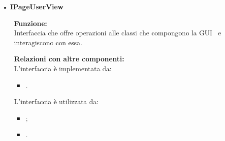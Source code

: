 {\begin{sloppypar}
{\begin{itemize}
\begin{itemize}
				\item[]  \textbf{Relazioni con altre componenti:} \\
				Implementa l’interfaccia:
				\begin{itemize}
					\item {}.
				\end{itemize}
				Usa le classi:
				\begin{itemize}
					\item {}.
				\end{itemize}					
				Tramite le interfacce:
				\begin{itemize}
					\item {}.
				\end{itemize}
				
				\item[]  \textbf{Attributi:}\\
				\texttt{- ICommunicationLogic communicationLogic}: riferimento alla classe \texttt{CommunicationLogic}.\\
				
				\item[]  \textbf{Metodi:}\\
				\texttt{+ MediaManage(IComunicationLogic comunicationLogic);}\\
				Costruttore: inizializza \texttt{CommunicationLogic} con il valore ricevuto come parametro.\\

				\texttt{+ void activeVideoLocal();}\\
				Invia una richiesta al Presenter attraverso il metodo \texttt{getLocalUrl()} per recuperare l’indirizzo del 
				video locale.\\
			\end{itemize}

		\item[•] \textbf{IPageUserView}
		\begin{itemize}
			\item[] \textbf{Funzione:} \\
			Interfaccia che offre operazioni alle classi che compongono la GUI\g~ e interagiscono con essa.
			
			\item[] \textbf{Relazioni con altre componenti:} \\
			L'interfaccia è implementata da:
			\begin{itemize}
				\item {}.
			\end{itemize}
			L'interfaccia è utilizzata da:
			\begin{itemize}
				\item {};
				\item {}.
			\end{itemize}
			

\end{itemize}
\end{itemize}}
\end{sloppypar}}
